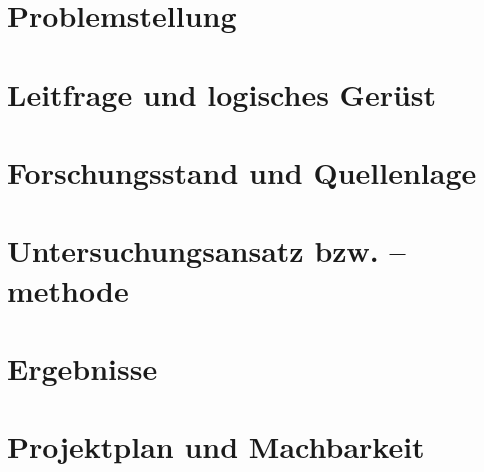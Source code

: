 \section{Problemstellung}
\section{Leitfrage und logisches Gerüst}
\section{Forschungsstand und Quellenlage}
\section{Untersuchungsansatz bzw. –methode}
\section{Ergebnisse}
\section{Projektplan und Machbarkeit}